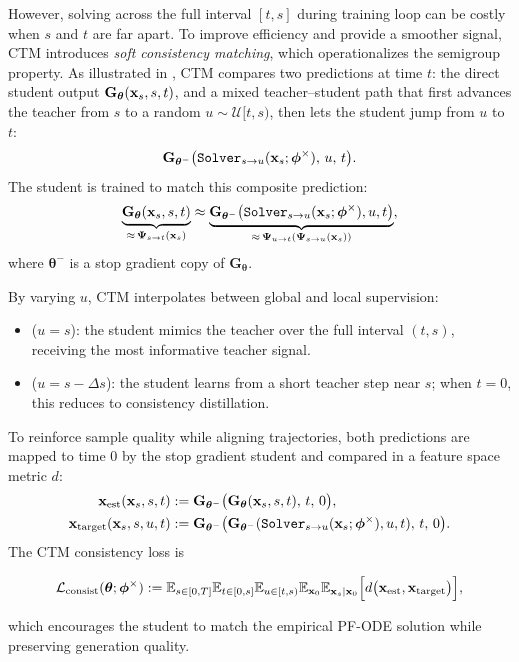 However, solving across the full interval $[t,s]$ during training loop can be costly when $s$ and $t$ are far
apart. To improve efficiency and provide a smoother signal, CTM introduces
\emph{soft consistency matching}, which operationalizes the semigroup property.
As illustrated in , CTM compares two predictions at time
$t$: the direct student output $\mathbf{G}_{\bm{\theta}}({\mathbf{x}}_s, s, t)$, and a
mixed teacher–student path that first advances the teacher from $s$ to a random
$u \sim \mathcal{U}[t,s)$, then lets the student jump from $u$ to $t$:
\[
\mathbf{G}_{\bm{\theta}^-} \big(\mathtt{Solver}_{s\to u}({\mathbf{x}}_s;\bm{\phi}^\times),\, u,\, t\big).
\]
The student is trained to match this composite prediction:
\begin{align}\label{eq:soft}
\underbrace{\mathbf{G}_{\bm{\theta}}({\mathbf{x}}_s, s, t)}_{\approx\, {\bm{\Psi}}_{s\to t}({\mathbf{x}}_s)}
 \approx 
\underbrace{\mathbf{G}_{\bm{\theta}^-} \big(\mathtt{Solver}_{s\to u}({\mathbf{x}}_s;\bm{\phi}^\times), u, t\big)}_{\approx\, {\bm{\Psi}}_{u\to t}({\bm{\Psi}}_{s\to u}({\mathbf{x}}_s))},
\end{align}
where $\bm{\theta}^-$ is a stop gradient copy of $\mathbf{G}_{\bm{\theta}}$.

By varying $u$, CTM interpolates between global and local supervision:
\begin{itemize}
    \item {} ($u = s$): the student mimics the teacher
    over the full interval $(t,s)$, receiving the most informative teacher
    signal.
    \item {} ($u = s - \Delta s$): the student learns
    from a short teacher step near $s$; when $t=0$, this reduces to consistency
    distillation.
\end{itemize}

To reinforce sample quality while aligning trajectories, both predictions are
mapped to time $0$ by the stop gradient student and compared in a feature
space metric $d$:
\begin{align*}
{\mathbf{x}}_{\mathrm{est}}({\mathbf{x}}_s,s,t) &:= \mathbf{G}_{\bm{\theta}^-} \big(\mathbf{G}_{\bm{\theta}}({\mathbf{x}}_s,s,t),\, t,\, 0\big),\\
{\mathbf{x}}_{\mathrm{target}}({\mathbf{x}}_s,s,u,t) &:= \mathbf{G}_{\bm{\theta}^-} \big(
\mathbf{G}_{\bm{\theta}^-}(\mathtt{Solver}_{s\to u}({\mathbf{x}}_s;\bm{\phi}^\times), u, t),\, t,\, 0\big).
\end{align*}
The CTM consistency loss is
\begin{mdframed}
    \begin{align}\label{eq:ctm-consist-distill}
\begin{aligned}
\mathcal{L}_{\mathrm{consist}}(\bm{\theta}; \bm{\phi}^\times)
:=
\mathbb{E}_{s \in [0,T]}\mathbb{E}_{t \in [0,s]}\mathbb{E}_{u \in [t,s)}
\mathbb{E}_{{\mathbf{x}}_0}\mathbb{E}_{{\mathbf{x}}_s |{\mathbf{x}}_0}
\Big[ d\big({\mathbf{x}}_{\mathrm{est}}, {\mathbf{x}}_{\mathrm{target}}\big) \Big],
\end{aligned}
\end{align}
\end{mdframed}
which encourages the student to match the empirical PF-ODE solution while
preserving generation quality.


